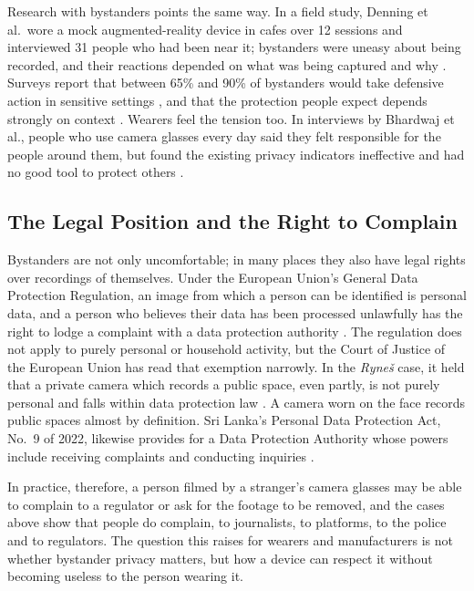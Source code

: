 Research with bystanders points the same way. In a field study, Denning et al.\ wore a
mock augmented-reality device in cafes over 12 sessions and interviewed 31 people who had
been near it; bystanders were uneasy about being recorded, and their reactions depended on
what was being captured and why \cite{denning2014}. Surveys report that between 65\% and
90\% of bystanders would take defensive action in sensitive settings \cite{mindthegap2026},
and that the protection people expect depends strongly on context \cite{ohagan2023}.
Wearers feel the tension too. In interviews by Bhardwaj et al., people who use camera
glasses every day said they felt responsible for the people around them, but found the
existing privacy indicators ineffective and had no good tool to protect others
\cite{bhardwaj2024}.

\subsection{The Legal Position and the Right to Complain}
\label{sec:legal}

Bystanders are not only uncomfortable; in many places they also have legal rights over
recordings of themselves. Under the European Union's General Data Protection Regulation,
an image from which a person can be identified is personal data, and a person who
believes their data has been processed unlawfully has the right to lodge a complaint with
a data protection authority \cite{gdpr2016}. The regulation does not apply to purely
personal or household activity, but the Court of Justice of the European Union has read
that exemption narrowly. In the \emph{Ryne\v{s}} case, it held that a private camera
which records a public space, even partly, is not purely personal and falls within data
protection law \cite{rynes2014}. A camera worn on the face records public spaces almost
by definition. Sri Lanka's Personal Data Protection Act, No.~9 of 2022, likewise
provides for a Data Protection Authority whose powers include receiving complaints and
conducting inquiries \cite{srilanka_pdpa2022}.

In practice, therefore, a person filmed by a stranger's camera glasses may be able to
complain to a regulator or ask for the footage to be removed, and the cases above show
that people do complain, to journalists, to platforms, to the police and to regulators.
The question this raises for wearers and manufacturers is not whether bystander privacy
matters, but how a device can respect it without becoming useless to the person wearing
it.

